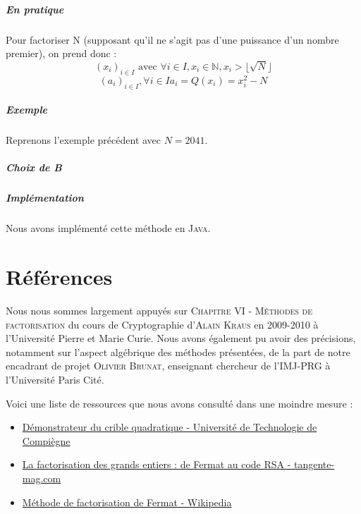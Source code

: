 \documentclass[11pt,a4paper]{article}
\begin{document}
	
	\subparagraph{En pratique}
	Pour factoriser N (supposant qu'il ne s'agit pas d'une puissance d'un nombre premier), on prend donc : 
	$$(x_i)_{i \in I} \text{ avec } \forall i \in I, x_i \in \mathbb{N}, x_i > \lfloor \sqrt{N} \rfloor$$
	$$ (a_i)_{i \in I}, \forall i \in I a_i = Q(x_i) = x_i^2 - N$$
	
	\subparagraph{Exemple}
	Reprenons l'exemple précédent avec $N = 2041$.
 
 	\subparagraph{Choix de B}
	
	
	
	
	
	
	
	
	\subparagraph{Implémentation}
	Nous avons implémenté cette méthode en \textsc{Java}.
	
	\newpage
	\section{\LARGE{Références}}
	Nous nous sommes largement appuyés sur \textsc{Chapitre VI - Méthodes de factorisation} du cours de Cryptographie d'\textsc{Alain Kraus} en 2009-2010 à l'Université Pierre et Marie Curie. Nous avons également pu avoir des précisions, notamment sur l'aspect algébrique des méthodes présentées, de la part de notre encadrant de projet \textsc{Olivier Brunat}, enseignant chercheur de l'IMJ-PRG à l'Université Paris Cité.
	
	Voici une liste de ressources que nous avons consulté dans une moindre mesure : 
	\begin{itemize}
		\item \href{https://www.utc.fr/~wschon/sr06/UtCrible/UtCrible.html#about}{Démonstrateur du crible quadratique - Université de Technologie de Compiègne}
		\item \href{https://www.tangente-mag.com/article.php?id=7059}{La factorisation des grands entiers : de Fermat au code RSA - tangente-mag.com}
		\item \href{https://fr.wikipedia.org/wiki/M%C3%A9thode_de_factorisation_de_Fermat}{Méthode de factorisation de Fermat - Wikipedia}	
	\end{itemize}
	
	
	
\end{document}
